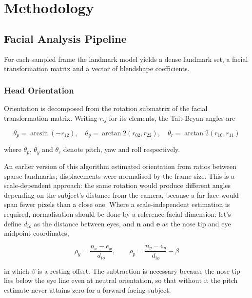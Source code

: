 \documentclass[conference]{IEEEtran}
\begin{document}
\section{Methodology}

\subsection{Facial Analysis Pipeline}

For each sampled frame the landmark model yields a dense landmark set, a
facial transformation matrix and a vector of blendshape coefficients.

\subsubsection{Head Orientation}

Orientation is decomposed from the rotation submatrix of the facial
transformation matrix. Writing $r_{ij}$ for its elements, the Tait-Bryan
angles are

\begin{equation}
\theta_{p} = \arcsin(-r_{12}),\quad
\theta_{y} = \arctan2(r_{02}, r_{22}),\quad
\theta_{r} = \arctan2(r_{10}, r_{11})
\label{eq:pose}
\end{equation}

where $\theta_{p}$, $\theta_{y}$ and $\theta_{r}$ denote pitch, yaw and
roll respectively.

An earlier version of this algorithm estimated orientation from ratios
between sparse landmarks; displacements were normalised by the frame size.
This is a scale-dependent approach: the same rotation would produce
different angles depending on the subject's distance from the camera,
because a far face would span fewer pixels than a close one.
Where a scale-independent estimation is required, normalisation should be done
by a reference facial dimension: let's define $d_{io}$ as the distance between eyes,
and $\mathbf{n}$ and $\mathbf{e}$ as the nose tip and eye midpoint coordinates,

\begin{equation}
\rho_{y} = \frac{n_{x} - e_{x}}{d_{io}}, \qquad
\rho_{p} = \frac{n_{y} - e_{y}}{d_{io}} - \beta
\label{eq:ratio}
\end{equation}

in which $\beta$ is a resting offset. The subtraction is necessary because
the nose tip lies below the eye line even at neutral orientation, so
that without it the pitch estimate never attains zero for a forward facing
subject.
\end{document}
